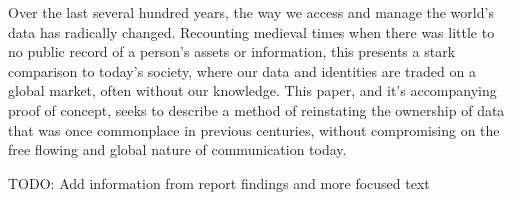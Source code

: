 \abstract

\thispagestyle{plain}
\setcounter{page}{1}

Over the last several hundred years, the way we access and manage the world's data has radically changed. Recounting medieval times when there was little to no public record of a person's assets or information, this presents a stark comparison to today's society, where our data and identities are traded on a global market, often without our knowledge. This paper, and it's accompanying proof of concept, seeks to describe a method of reinstating the ownership of data that was once commonplace in previous centuries, without compromising on the free flowing and global nature of communication today.

TODO: Add information from report findings and more focused text



